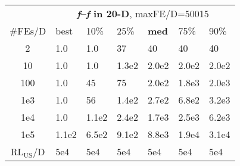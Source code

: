 \begin{tabular}{c|llllll}
 & \multicolumn{6}{|c}{\textbf{\textit{f}\raisebox{-0.35ex}{1}--\textit{f}\raisebox{-0.35ex}{24} in 20-D}, maxFE/D=50015}\\
\#FEs/D & best & 10\% & 25\% & \textbf{med} & 75\% & 90\%\\
2 & \hspace*{1ex}1.0 & \hspace*{1ex}1.0 & 37 & 40 & 40 & 40\\
10 & \hspace*{1ex}1.0 & \hspace*{1ex}1.0 & 1.3e2 & 2.0e2 & 2.0e2 & 2.0e2\\
100 & \hspace*{1ex}1.0 & 45 & 75 & 2.0e2 & 1.8e3 & 2.0e3\\
1e3 & \hspace*{1ex}1.0 & 56 & 1.4e2 & 2.7e2 & 6.8e2 & 3.2e3\\
1e4 & \hspace*{1ex}1.0 & 1.1e2 & 2.4e2 & 1.7e3 & 2.5e3 & 6.2e3\\
1e5 & 1.1e2 & 6.5e2 & 9.1e2 & 8.8e3 & 1.9e4 & 3.1e4\\
$\text{RL}_{\text{US}}$/D & 5e4 & 5e4 & 5e4 & 5e4 & 5e4 & 5e4
\end{tabular}
